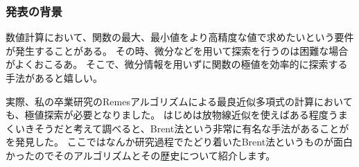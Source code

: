 \begin{frame}
 \frametitle{発表の背景}
    数値計算において、関数の最大、最小値をより高精度な値で求めたいという要件が発生することがある。
    その時、微分などを用いて探索を行うのは困難な場合がよくおこるあ。
    そこで、微分情報を用いずに関数の極値を効率的に探索する手法があると嬉しい。
\end{frame}
\begin{frame}
    実際、私の卒業研究のRemesアルゴリズムによる最良近似多項式の計算においても、極値探索が必要となりました。
    はじめは放物線近似を使えばある程度うまくいきそうだと考えて調べると、Brent法という非常に有名な手法があることがを発見した。
    ここではなんか研究過程でたどり着いたBrent法というものが面白かったのでそのアルゴリズムとその歴史について紹介します。
\end{frame}
